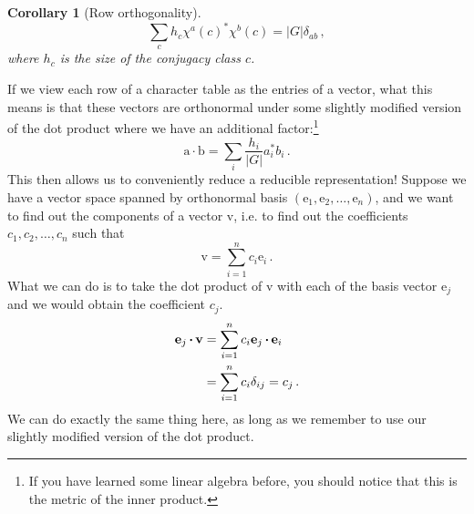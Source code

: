 \documentclass{article}
\theoremstyle{plain}\theoremheaderfont{\normalfont\itshape}\theorembodyfont{\rmfamily}\theoremseparator{.}\newtheorem*{rem}{Remark}\newtheorem*{ex}{Example}\newtheorem*{proof}{Proof}\newtheorem*{altp}{Alternative proof}
\theoremstyle{plain}\theoremheaderfont{\normalfont\bfseries}\theorembodyfont{\rmfamily}\theoremseparator{.}\newtheorem{thm}{Theorem}[section]\newtheorem{lem}[thm]{Lemma}\newtheorem{prop}[thm]{Proposition}\newtheorem*{cor}{Corollary}\newtheorem{defn}[thm]{Definition}\newtheorem{clm}[thm]{Claim}\newtheorem{clminproof}{Claim}\newtheorem*{law}{Law}\newtheorem{pos}[thm]{Postulate}
\theoremstyle{break}\theoremheaderfont{\normalfont\itshape}\theorembodyfont{\rmfamily}\theoremseparator{.\medskip}\newtheorem*{proofskip}{Proof}\newtheorem*{exs}{Examples}\newtheorem*{rems}{Remarks}
\theoremstyle{break}\theoremheaderfont{\normalfont\bfseries}\theorembodyfont{\rmfamily}\theoremseparator{.\medskip}\newtheorem{lemskip}[thm]{Lemma}\newtheorem{defnskip}[thm]{Definition}\newtheorem{propskip}[thm]{Proposition}\newtheorem{thmskip}[thm]{Theorem}
\numberwithin{equation}{section}
\newcommand{\vb}[1]{\bm{\mathrm{#1}}}
\newcommand{\vdot}{\,\bm{\mathrm{\cdot}}\,}
\newcommand{\abs}[1]{\left| #1 \right|}
\begin{document}
    \begin{cor}[Row orthogonality]
        \begin{equation}
            \sum_c h_c\chi^a(c)^*\chi^b(c)=\abs{G}\delta_{ab}\,,
        \end{equation}
        where \(h_c\) is the size of the conjugacy class \(c\).
    \end{cor}

    If we view each row of a character table as the entries of a vector, what this means is that these vectors are orthonormal under some slightly modified version of the dot product where we have an additional factor:\footnote{If you have learned some linear algebra before, you should notice that this is the metric of the inner product.}
    \begin{equation}
        \vb{a}\vdot\vb{b}=\sum_{i}\frac{h_i}{\abs{G}}a_i^*b_i\,.
    \end{equation}
    This then allows us to conveniently reduce a reducible representation! Suppose we have a vector space spanned by orthonormal basis \((\vb{e}_1,\vb{e}_2,\dots,\vb{e}_n)\), and we want to find out the components of a vector \(\vb{v}\), i.e. to find out the coefficients \(c_1,c_2,\dots,c_n\) such that
    \begin{equation}
        \vb{v}=\sum_{i=1}^{n}c_i\vb{e}_i\,.
    \end{equation}
    What we can do is to take the dot product of \(\vb{v}\) with each of the basis vector \(\vb{e}_j\) and we would obtain the coefficient \(c_j\).
    \begin{align}
        \vb{e}_j\vdot\vb{v}&=\sum_{i=1}^{n}c_i\vb{e}_j\vdot\vb{e}_i\notag\\
        &=\sum_{i=1}^{n}c_i\delta_{ij}=c_j\,.
    \end{align}
    We can do exactly the same thing here, as long as we remember to use our slightly modified version of the dot product.
\end{document}
